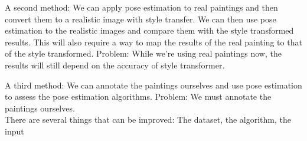 A second method: We can apply pose estimation to real paintings and then convert them to a realistic image with style transfer.
We can then use pose estimation to the realistic images and compare them with the style transformed results.
This will also require a way to map the results of the real painting to that of the style transformed. 
Problem: While we’re using real paintings now, the results will still depend on the accuracy of style transformer. 

A third method: We can annotate the paintings ourselves and use pose estimation to assess the pose estimation algorithms. 
Problem: We must annotate the paintings ourselves.
\\
There are several things that can be improved:
The dataset, the algorithm, the input